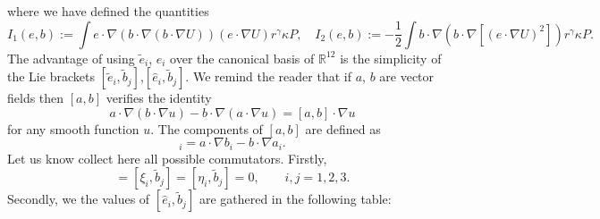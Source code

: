 \documentclass[10pt,oneside]{amsart}
\numberwithin{equation}{section}
\numberwithin{definition}{section}
\numberwithin{theorem}{section}
\numberwithin{lemma}{section}
\begin{document}
%
where we have defined the quantities
%
\begin{equation*}
  I_{1}(e,b):=\int e\cdot\nabla\left(b\cdot\nabla\left(b\cdot\nabla U\right)\right)\left(e\cdot\nabla U\right)r^\gamma \kappa P,\quad 
  I_{2}(e,b):=-\frac{1}{2}\int b\cdot\nabla\left( b\cdot\nabla\left[(e\cdot\nabla U)^{2}\right]\right)r^\gamma \kappa P.
\end{equation*}
%
The advantage of using $\tilde{e}_{i}$, $\hat{e}_{i}$ over the canonical basis of $\mathbb{R}^{12}$ is the simplicity of the Lie brackets $[\tilde{e}_{i},\tilde{b}_{j}]$,$[\hat{e}_{i},\tilde{b}_{j}]$. We remind the reader that if $a$, $b$ are vector fields then $[a,b]$ verifies the identity
%
\begin{equation*}
  a\cdot\nabla\left(b\cdot\nabla u\right)-b\cdot\nabla\left(a\cdot\nabla u\right)=[a,b]\cdot\nabla u
\end{equation*}
%
for any smooth function $u$. The components of $[a,b]$ are defined as
%
\begin{equation*}
  [a,b]_{i}=a\cdot\nabla b_{i}-b\cdot\nabla a_{i}.
\end{equation*}
%
Let us know collect here all possible commutators. Firstly,
%
\begin{equation*}
  [\tilde{e}_{i},\tilde{b}_{j}]=[\xi_i,\tilde{b}_{j}]=[\eta_i,\tilde{b}_{j}]=0,\qquad i,j=1,2,3.
\end{equation*}
%
Secondly, we the values of $[\hat{e}_{i},\tilde{b}_{j}]$ are gathered in the following table:
\end{document}
